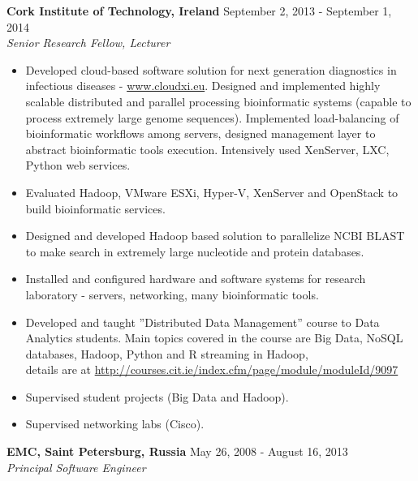 \documentclass[a4paper,12pt,]{article}
\begin{document}
\begin{description}
  \item{\bfseries Cork Institute of Technology, Ireland} \hfill September 2, 2013 - September 1, 2014 \\
    {\em Senior Research Fellow, Lecturer}

    \begin{itemize}

    \item Developed cloud-based software solution for next generation diagnostics in infectious diseases - \url{www.cloudxi.eu}. Designed and implemented highly scalable distributed and parallel processing bioinformatic systems (capable to process extremely large genome sequences). Implemented load-balancing of bioinformatic workflows among servers, designed management layer to abstract bioinformatic tools execution. Intensively used XenServer, LXC, Python web services.

    \item Evaluated Hadoop, VMware ESXi, Hyper-V, XenServer and OpenStack to build bioinformatic services.

    \item Designed and developed Hadoop based solution to parallelize NCBI BLAST to make search in extremely large nucleotide and protein databases.

    \item Installed and configured hardware and software systems for research laboratory - servers, networking, many bioinformatic tools.

    \item Developed and taught ”Distributed Data Management” course to Data Analytics students. Main topics covered in the course are Big Data, NoSQL databases, Hadoop, Python and R streaming in Hadoop, \\
             details are at \url{http://courses.cit.ie/index.cfm/page/module/moduleId/9097}

    \item Supervised student projects (Big Data and Hadoop).

    \item Supervised networking labs (Cisco).

    \end{itemize}

  \item{\bfseries EMC, Saint Petersburg, Russia} \hfill  May 26, 2008 - August 16, 2013 \\
    {\em Principal Software Engineer}  


\end{description}
\end{document}

